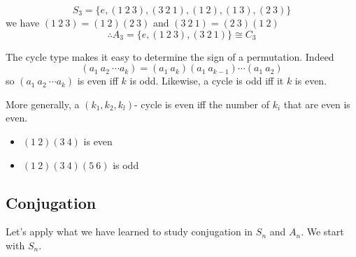 \documentclass{article}
\begin{document}
\begin{eg}
    \[
        S_3 = \{e, (1\ 2\ 3), (3\ 2\ 1), (1\ 2), (1\ 3), (2\ 3)\}    
    \]
    we have $(1\ 2\ 3) = (1\ 2)(2\ 3)$ and $(3\ 2\ 1) = (2\ 3)(1\ 2)$
    \[
      \therefore A_3 = \{e, (1\ 2\ 3), (3\ 2\ 1)\} \cong C_3  
    \]
\end{eg}
\begin{remark}
    The cycle type makes it easy to determine the sign of a permutation. Indeed
    \[
      (a_1\ a_2\ \cdots a_k) = (a_1\ a_k)(a_1\ a_{k-1})\cdots(a_1\ a_2)  
    \]
    so $(a_1\ a_2\ \cdots a_k)$ is even iff $k$ is odd. Likewise, a cycle is odd iff it $k$ is even.

    More generally, a $(k_1, k_2, k_l)$- cycle is even iff the number of $k_i$ that are even is even.
\end{remark}
\begin{eg}\leavevmode
    \begin{itemize}
        \item $(1\ 2)(3\ 4)$ is even
        \item $(1\ 2)(3\ 4)(5\ 6)$ is odd
    \end{itemize}
\end{eg}

\subsection{Conjugation}
Let's apply what we have learned to study conjugation in $S_n$ and $A_n$. We start with $S_n$.
\end{document}
